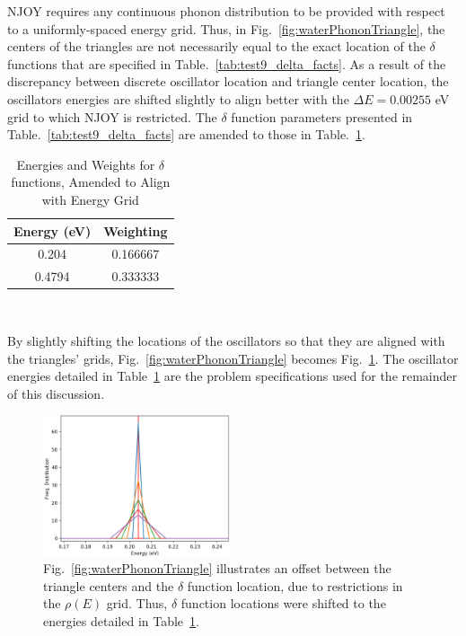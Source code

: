 \documentclass[Master.tex]{subfiles}
\begin{document}
    NJOY requires any continuous phonon distribution to be provided with respect to a uniformly-spaced energy grid. Thus, in Fig.~\ref{fig:waterPhononTriangle}, the centers of the triangles are not necessarily equal to the exact location of the $\delta$ functions that are specified in Table.~\ref{tab:test9_delta_facts}. 
    As a result of the discrepancy between discrete oscillator location and triangle center location, the oscillators energies are shifted slightly to align better with the $\Delta E=0.00255$ eV grid to which NJOY is restricted. The $\delta$ function parameters presented in Table.~\ref{tab:test9_delta_facts} are amended to those in Table.~\ref{tab:amended_delta_facts}.
    \begin{table}[h]
      \centering
      \caption[Energies and Weights for $\delta$ functions, Amended to Align with Energy Grid]{Energies and Weights for $\delta$ functions, Amended to Align with Energy Grid}
      \label{tab:amended_delta_facts}
      \begin{tabular}{ |c|c| }\hline
        Energy (eV)& Weighting\\\hline
        0.204& 0.166667\\\hline
        0.4794 & 0.333333 \\\hline
      \end{tabular}\\[1ex]
    \end{table}
    By slightly shifting the locations of the oscillators so that they are aligned with the triangles' grids, Fig.~\ref{fig:waterPhononTriangle} becomes Fig.~\ref{fig:waterPhononTriangleZoomedShifted}. The oscillator energies detailed in Table~\ref{tab:amended_delta_facts} are the problem specifications used for the remainder of this discussion. 

    \begin{figure}[h]
      \begin{center}
        \includegraphics[width=0.49\textwidth]{alteredDeltaZoomedb}
        \caption[Triangles of various widths, plotted alongside shifted $\delta$ functions]{Fig.~\ref{fig:waterPhononTriangle} illustrates an offset between the triangle centers and the $\delta$ function location, due to restrictions in the $\rho(E)$ grid. Thus, $\delta$ function locations were shifted to the energies detailed in Table~\ref{tab:amended_delta_facts}.}
        \label{fig:waterPhononTriangleZoomedShifted}
      \end{center}
    \end{figure}
\end{document}

